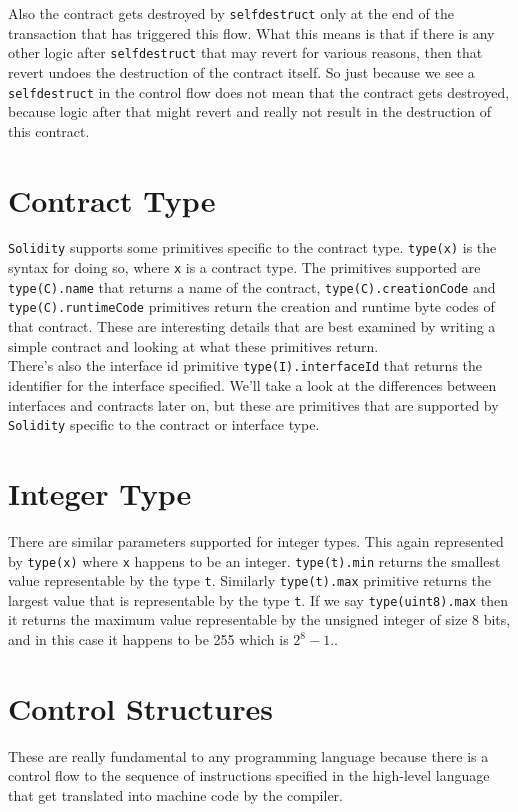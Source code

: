 Also the contract gets destroyed by \texttt{selfdestruct} only at the end of the transaction that has triggered this flow. What this means is that if there is any other logic after \texttt{selfdestruct} that may revert for various reasons, then that revert undoes the destruction of the contract itself. So just because we see a \texttt{selfdestruct} in the control flow does not mean that the contract gets destroyed, because logic after that might revert and really not result in the destruction of this contract.

\section{Contract Type}
\texttt{Solidity} supports some primitives specific to the contract type. \texttt{type(x)} is the syntax for doing so, where \texttt{x} is a contract type. The primitives supported are \texttt{type(C).name} that returns a name of the contract, \texttt{type(C).creationCode} and \texttt{type(C).runtimeCode} primitives return the creation and runtime byte codes of that contract. These are interesting details that are best examined by writing a simple contract and looking at what these primitives return. \\

There's also the interface id primitive \texttt{type(I).interfaceId} that returns the identifier for the interface specified. We'll take a look at the differences between interfaces and contracts later on, but these are primitives that are supported by \texttt{Solidity} specific to the contract or interface type.

\section{Integer Type}
There are similar parameters supported for integer types. This again represented by \texttt{type(x)} where \texttt{x} happens to be an integer. \texttt{type(t).min} returns the smallest value representable by the type \texttt{t}. Similarly \texttt{type(t).max} primitive returns the largest value that is representable by the type \texttt{t}. If we say  \texttt{type(uint8).max} then it returns the maximum value representable by the unsigned integer of size 8 bits, and in this case it happens to be 255 which is $2^8 -1$..

\section{Control Structures}
These are really fundamental to any programming language because there is a control flow to the sequence of instructions specified in the high-level language that get translated into machine code by the compiler.\\


